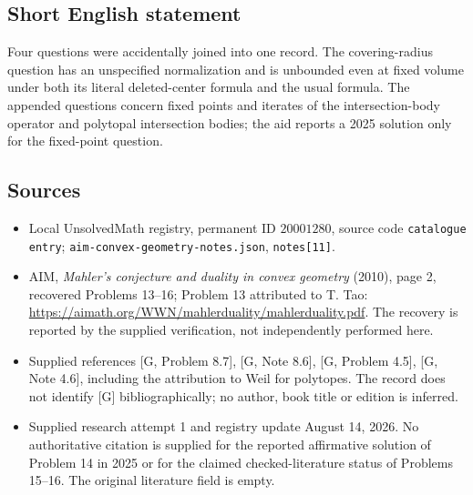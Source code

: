 \documentclass[11pt]{article}
\begin{document}
\subsection{Short English statement}
Four questions were accidentally joined into one record. The covering-radius question has an unspecified normalization and is unbounded even at fixed volume under both its literal deleted-center formula and the usual formula. The appended questions concern fixed points and iterates of the intersection-body operator and polytopal intersection bodies; the aid reports a 2025 solution only for the fixed-point question.
\subsection{Sources}
\begin{itemize}
\item Local UnsolvedMath registry, permanent ID \(20001280\), source code \texttt{catalogue entry}; \texttt{aim-convex-geometry-notes.json}, \texttt{notes[11]}.
\item AIM, \emph{Mahler's conjecture and duality in convex geometry} (2010), page 2, recovered Problems 13--16; Problem 13 attributed to T. Tao: \url{https://aimath.org/WWN/mahlerduality/mahlerduality.pdf}. The recovery is reported by the supplied verification, not independently performed here.
\item Supplied references [G, Problem 8.7], [G, Note 8.6], [G, Problem 4.5], [G, Note 4.6], including the attribution to Weil for polytopes. The record does not identify [G] bibliographically; no author, book title or edition is inferred.
\item Supplied research attempt 1 and registry update August 14, 2026. No authoritative citation is supplied for the reported affirmative solution of Problem 14 in 2025 or for the claimed checked-literature status of Problems 15--16. The original literature field is empty.
\end{itemize}
\end{document}
